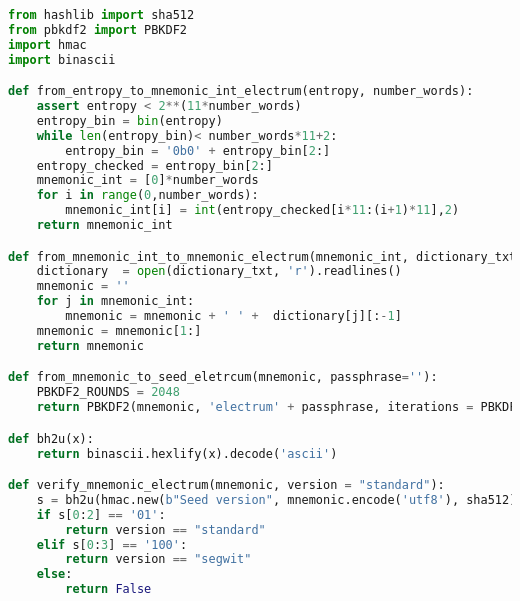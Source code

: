 \begin{lstlisting}[language=Python]
from hashlib import sha512
from pbkdf2 import PBKDF2
import hmac
import binascii

def from_entropy_to_mnemonic_int_electrum(entropy, number_words):
	assert entropy < 2**(11*number_words)
	entropy_bin = bin(entropy)
	while len(entropy_bin)< number_words*11+2:
		entropy_bin = '0b0' + entropy_bin[2:]
	entropy_checked = entropy_bin[2:]
	mnemonic_int = [0]*number_words
	for i in range(0,number_words):
		mnemonic_int[i] = int(entropy_checked[i*11:(i+1)*11],2)
	return mnemonic_int

def from_mnemonic_int_to_mnemonic_electrum(mnemonic_int, dictionary_txt):
	dictionary  = open(dictionary_txt, 'r').readlines()
	mnemonic = ''
	for j in mnemonic_int:
		mnemonic = mnemonic + ' ' +  dictionary[j][:-1]
	mnemonic = mnemonic[1:]
	return mnemonic

def from_mnemonic_to_seed_eletrcum(mnemonic, passphrase=''):
	PBKDF2_ROUNDS = 2048
	return PBKDF2(mnemonic, 'electrum' + passphrase, iterations = PBKDF2_ROUNDS, macmodule = hmac, digestmodule = sha512).read(64).hex()

def bh2u(x):
	return binascii.hexlify(x).decode('ascii')

def verify_mnemonic_electrum(mnemonic, version = "standard"):
	s = bh2u(hmac.new(b"Seed version", mnemonic.encode('utf8'), sha512).digest()) 
	if s[0:2] == '01':
		return version == "standard"
	elif s[0:3] == '100':
		return version == "segwit"
	else:
		return False
\end{lstlisting}